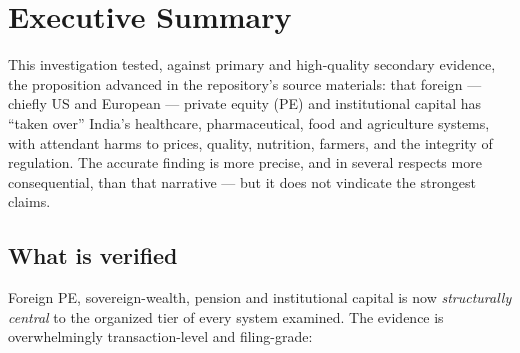 \documentclass[11pt,a4paper]{article}
\begin{document}
\newpage
\tableofcontents
\newpage

\section{Executive Summary}
This investigation tested, against primary and high-quality secondary evidence, the proposition advanced in the repository's source materials: that foreign --- chiefly US and European --- private equity (PE) and institutional capital has ``taken over'' India's healthcare, pharmaceutical, food and agriculture systems, with attendant harms to prices, quality, nutrition, farmers, and the integrity of regulation. The accurate finding is more precise, and in several respects more consequential, than that narrative --- but it does not vindicate the strongest claims.

\subsection{What is verified}
Foreign PE, sovereign-wealth, pension and institutional capital is now \emph{structurally central} to the organized tier of every system examined. The evidence is overwhelmingly transaction-level and filing-grade:
\end{document}
